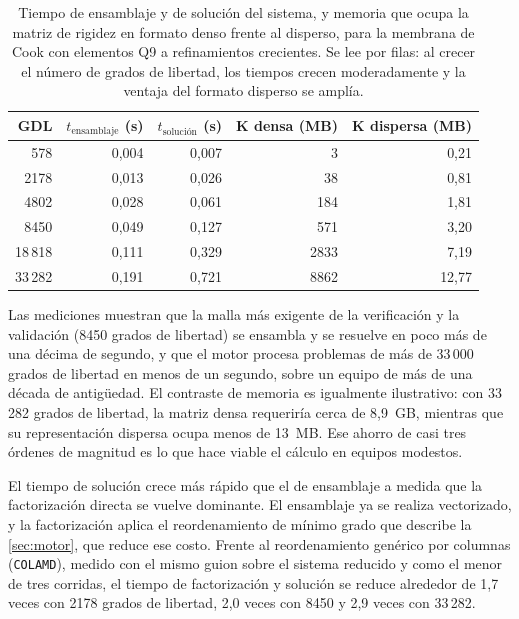 \begin{table}[htbp]
\centering
\caption[Tiempos de ensamblaje y solución, y memoria de la matriz de rigidez (Cook Q9).]{Tiempo de ensamblaje y de solución del sistema, y memoria que ocupa la matriz de rigidez en formato denso frente al disperso, para la membrana de Cook con elementos Q9 a refinamientos crecientes. Se lee por filas: al crecer el número de grados de libertad, los tiempos crecen moderadamente y la ventaja del formato disperso se amplía.}
\label{tab:tiempos}
\begin{tabular}{r r r r r}
\toprule
GDL & $t_{\text{ensamblaje}}$ (s) & $t_{\text{solución}}$ (s) & $\bm{K}$ densa (MB) & $\bm{K}$ dispersa (MB) \\
\midrule
578   & 0,004 & 0,007 & 3    & 0,21  \\
2178  & 0,013 & 0,026 & 38   & 0,81  \\
4802  & 0,028 & 0,061 & 184  & 1,81  \\
8450  & 0,049 & 0,127 & 571  & 3,20  \\
18\,818 & 0,111 & 0,329 & 2833 & 7,19  \\
33\,282 & 0,191 & 0,721 & 8862 & 12,77 \\
\bottomrule
\end{tabular}
{\singlespacing{}}
\end{table}

Las mediciones muestran que la malla más exigente de la verificación y la validación (8450 grados de libertad) se ensambla y se resuelve en poco más de una décima de segundo, y que el motor procesa problemas de más de 33\,000 grados de libertad en menos de un segundo, sobre un equipo de más de una década de antigüedad. El contraste de memoria es igualmente ilustrativo: con 33\,282 grados de libertad, la matriz densa requeriría cerca de 8,9~GB, mientras que su representación dispersa ocupa menos de 13~MB. Ese ahorro de casi tres órdenes de magnitud es lo que hace viable el cálculo en equipos modestos.

El tiempo de solución crece más rápido que el de ensamblaje a medida que la factorización directa se vuelve dominante. El ensamblaje ya se realiza vectorizado, y la factorización aplica el reordenamiento de mínimo grado que describe la \autoref{sec:motor}, que reduce ese costo. Frente al reordenamiento genérico por columnas (\texttt{COLAMD}), medido con el mismo guion sobre el sistema reducido y como el menor de tres corridas, el tiempo de factorización y solución se reduce alrededor de 1,7 veces con 2178 grados de libertad, 2,0 veces con 8450 y 2,9 veces con 33\,282.

